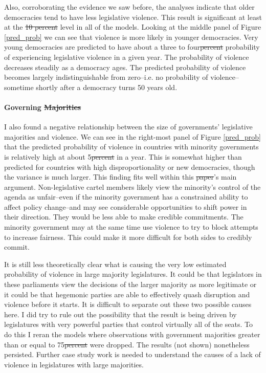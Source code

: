 \documentclass[a4paper]{article}\usepackage[]{graphicx}\usepackage[]{color}
\providecommand{\DIFaddtex}[1]{{\protect\color{blue}\uwave{#1}}} %
\providecommand{\DIFdeltex}[1]{{\protect\color{red}\sout{#1}}}                      %
\providecommand{\DIFaddbegin}{} %
\providecommand{\DIFaddend}{} %
\providecommand{\DIFdelbegin}{} %
\providecommand{\DIFdelend}{} %
\providecommand{\DIFadd}[1]{\texorpdfstring{\DIFaddtex{#1}}{#1}} %
\providecommand{\DIFdel}[1]{\texorpdfstring{\DIFdeltex{#1}}{}} %
\begin{document}
Also, corroborating the evidence we saw before, the analyses indicate that older democracies tend to have less legislative violence. This result is significant at least at the \DIFdelbegin \DIFdel{10 percent }\DIFdelend \DIFaddbegin \DIFadd{5\% }\DIFaddend level in all of the models. Looking at the middle panel of Figure \ref{pred_prob} we can see that violence is more likely in younger democracies. Very young democracies are predicted to have about a three to four\DIFdelbegin \DIFdel{percent }\DIFdelend \DIFaddbegin \DIFadd{\% }\DIFaddend probability of experiencing legislative violence in a given year. The probability of violence decreases steadily as a democracy ages. The predicted probability of violence becomes largely indistinguishable from zero--i.e. no probability of violence--sometime shortly after a democracy turns 50 years old.

\paragraph{Governing \DIFdelbegin \DIFdel{Majorities}\DIFdelend \DIFaddbegin \DIFadd{majorities}\DIFaddend }

I also found a negative relationship between the size of governments' legislative majorities and violence. We can see in the right-most panel of Figure \ref{pred_prob} that the predicted probability of violence in countries with minority governments is relatively high at about 5\DIFdelbegin \DIFdel{percent }\DIFdelend \DIFaddbegin \DIFadd{\% }\DIFaddend in a year. This is somewhat higher than predicted for countries with high disproportionality or new democracies, though the variance is much larger. This finding fits well within this \DIFdelbegin \DIFdel{paper}\DIFdelend \DIFaddbegin \DIFadd{article}\DIFaddend 's main argument. Non-legislative cartel members likely view the minority's control of the agenda as unfair--even if the minority government has a constrained ability to affect policy change--and may see considerable opportunities to shift power in their direction. They would be less able to make credible commitments. The minority government may at the same time use violence to try to block attempts to increase fairness. This could make it more difficult for both sides to credibly commit.

It is still less theoretically clear what is causing the very low estimated probability of violence in large majority legislatures. It could be that legislators in these parliaments view the decisions of the larger majority as more legitimate or it could be that hegemonic parties are able to effectively quash disruption and violence before it starts. It is difficult to separate out these two possible causes here. I did try to rule out the possibility that the result is being driven by legislatures with very powerful parties that control virtually all of the seats. To do this I reran the models where observations with government majorities greater than or equal to 75\DIFdelbegin \DIFdel{percent }\DIFdelend \DIFaddbegin \DIFadd{\% }\DIFaddend were dropped. The results (not shown) nonetheless persisted. Further case study work is needed to understand the causes of a lack of violence in legislatures with large majorities.
\end{document}
